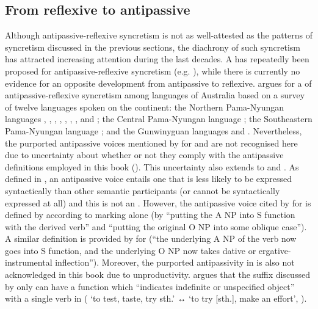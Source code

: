 \subsection{From reflexive to antipassive} \label{diachrony:refl2antp}
Although antipassive-reflexive syncretism is not as well-attested as the patterns of syncretism discussed in the previous sections, the diachrony of such syncretism has attracted increasing attention during the last decades. A  has repeatedly been proposed for antipassive-reflexive syncretism (e.g. \citealt{terrill:1997, janic:2010, sanso:2017, sanso:2018}), while there is currently no evidence for an opposite development from antipassive to reflexive. \citet{terrill:1997} argues for a  of antipassive-reflexive syncretism among languages of Australia based on a survey of twelve languages spoken on the continent: the Northern Pama-Nyungan languages , , , , , , , and ; the Central Pama-Nyungan language ; the Southeastern Pama-Nyungan language ; and the Gunwinyguan languages  and . Nevertheless, the purported antipassive voices mentioned by \citeauthor{terrill:1997} for  and  are not recognised here due to uncertainty about whether or not they comply with the antipassive definitions employed in this book (). This uncertainty also extends to  and . As defined in , an antipassive voice entails one  that is less likely to be expressed syntactically than other semantic participants (or cannot be syntactically expressed at all) and this  is not an . However, the antipassive voice cited by \citeauthor{terrill:1997} for  is defined by \citet[128]{haviland:1979} according to  marking alone (by “putting the A NP into S function with the derived verb” and “putting the original O NP into some oblique case”). A similar definition is provided by \citet[496]{dixon:1983} for  (“the underlying A NP of the verb now goes into S function, and the underlying O NP now takes dative or ergative-instrumental inflection”). Moreover, the purported antipassivity in  is also not acknowledged in this book due to unproductivity. \citet{heath:1978} argues that the suffix  discussed by \citet{terrill:1997} only can have a function which “indicates indefinite or unspecified object” with a single verb in  ( ‘to test, taste, try sth.’ ↔  ‘to try [sth.], make an effort’, \citealt[92]{heath:1978}).

